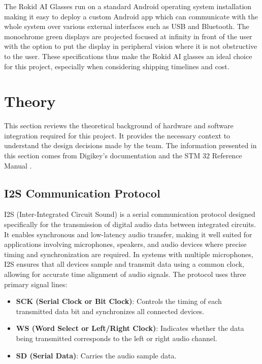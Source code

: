 \documentclass[12pt, titlepage]{article}
\begin{document}
The Rokid AI Glasses run on a standard Android operating system installation
making it easy to deploy a custom Android app which can communicate with the
whole system over various external interfaces such as USB and Bluetooth. The
monochrome green displays are projected focused at infinity in front of the user
with the option to put the display in peripheral vision where it is not
obstructive to the user. These specifications thus make the Rokid AI glasses an
ideal choice for this project, especially when considering shipping timelines
and cost. 


\label{sec:theory}
\section{Theory}

This section reviews the theoretical background of hardware and software
integration required for this project. It provides the necessary context to
understand the design decisions made by the team. The information presented in
this section comes from Digikey's documentation \cite{I2S} and the STM 32
Reference Manual \cite{STM_REFERENCE_MANUAL}.

\subsection{I2S Communication Protocol}
\label{sec:i2s_protocol}

I2S (Inter-Integrated Circuit Sound) is a serial communication protocol designed
specifically for the transmission of digital audio data between integrated
circuits. It enables synchronous and low-latency audio transfer, making it well
suited for applications involving microphones, speakers, and audio devices where
precise timing and synchronization are required. In systems with multiple
microphones, I2S ensures that all devices sample and transmit data using a
common clock, allowing for accurate time alignment of audio signals.
\newline
\newline
\noindent The protocol uses three primary signal lines:
\begin{itemize}
    \item \textbf{SCK (Serial Clock or Bit Clock)}: Controls the timing of each
        transmitted data bit and synchronizes all connected devices.
    \item \textbf{WS (Word Select or Left/Right Clock)}: Indicates whether the
        data being transmitted corresponds to the left or right audio channel.
    \item \textbf{SD (Serial Data)}: Carries the audio sample data.
\end{itemize}
\end{document}
